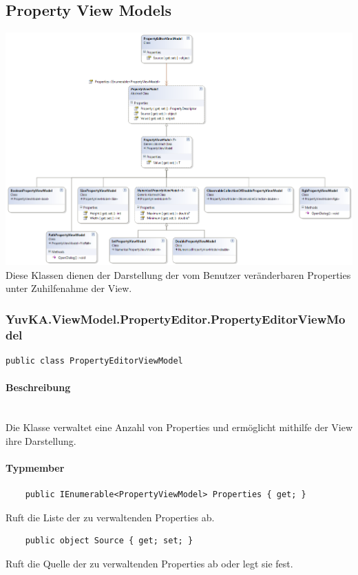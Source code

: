 \subsection{Property View Models}


\includegraphics[width=\textwidth]{YuvKA.ViewModel.PropertyEditor/propertyEditor.png}
Diese Klassen dienen der Darstellung der vom Benutzer veränderbaren Properties unter Zuhilfenahme der View. 



\subsubsection{YuvKA.ViewModel.PropertyEditor.PropertyEditorViewModel}

\begin{verbatim}
public class PropertyEditorViewModel
\end{verbatim}

\paragraph{Beschreibung}~\\
Die Klasse  verwaltet eine Anzahl von Properties und ermöglicht mithilfe der View ihre Darstellung.

\paragraph{Typmember}
\begin{itemize}

	\begin{verbatim}
	public IEnumerable<PropertyViewModel> Properties { get; }
	\end{verbatim}
	Ruft die Liste der zu verwaltenden Properties ab.

	\begin{verbatim}
	public object Source { get; set; }
	\end{verbatim}
	Ruft die Quelle der zu verwaltenden Properties ab oder legt sie fest.

\end{itemize}




